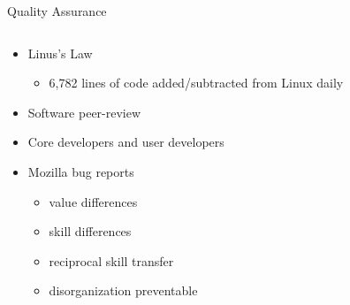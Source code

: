 \begin{frame}{Quality Assurance}
  \begin{column}{.6\textwidth}
    \begin{itemize}
      \item Linus's Law
        \begin{itemize}
          \item 6,782 lines of code added/subtracted from Linux daily~\cite[12:03]{zemlin}
        \end{itemize}
      \item Software peer-review
      \item Core developers and user developers
      \item Mozilla bug reports~\cite[p. 352]{wang}
        \begin{itemize}
          \item value differences
          \item skill differences
          \item reciprocal skill transfer
          \item disorganization preventable
        \end{itemize}
    \end{itemize}
  \end{column}
  \begin{column}{.4\textwidth}\raggedleft{}
    \begin{figure}
      \def\svgwidth{0.75\columnwidth}
      
      \caption{\Protect\cite{firefox}}
    \end{figure}
  \end{column}
\end{frame}

